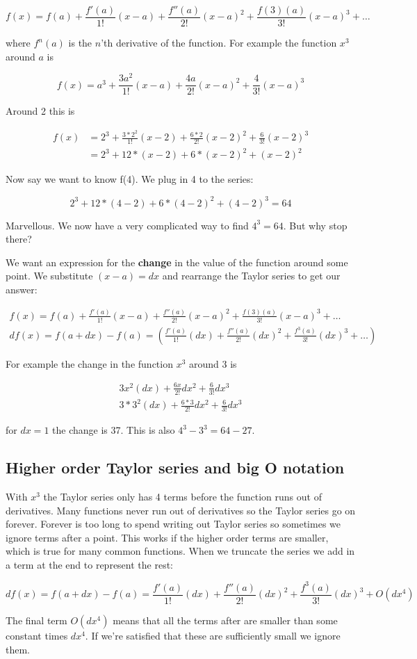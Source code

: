 \[f(x) = f(a) + \frac{f'(a)}{1!}(x-a) + \frac{f''(a)}{2!}(x-a)^2 + \frac{f(3)(a)}{3!}(x-a)^3 + \ldots  \]

where $f^n(a)$ is the $n$'th derivative of the function. For example the function $x^3$ around $a$ is  

\[f(x) = a^3 + \frac{3a^2}{1!}(x-a)  + \frac{4a}{2!}(x-a)^2 + \frac{4}{3!}(x-a)^3\]

Around 2 this is

\begin{eqnarray*}
f(x) &= 2^3 + \frac{3*2^2}{1!}(x-2)  + \frac{6*2}{2!}(x-2)^2 + \frac{6}{3!}(x-2)^3 \\
 &= 2^3 + 12*(x-2) + 6*(x-2)^2 + (x-2)^2
\end{eqnarray*}

Now say we want to know f(4). We plug in 4 to the series:

\[2^3 +12*(4-2) + 6*(4-2)^2 + (4-2)^3 = 64\]
 
 Marvellous. We now have a very complicated way to find $4^3=64$. But why stop there? 
 
 We want an expression for the \textbf{change} in the value of the function around some point. We substitute $(x-a) = dx$ and rearrange the Taylor series to get our answer:
 
 
 \begin{eqnarray*}
 f(x) = f(a) + \frac{f'(a)}{1!}(x-a) + \frac{f''(a)}{2!}(x-a)^2 + \frac{f(3)(a)}{3!}(x-a)^3 + \ldots  \\
df(x) =f(a+dx) -  f(a)  =  \left(\frac{f'(a)}{1!}(dx) + \frac{f''(a)}{2!}(dx)^2 + \frac{f^3(a)}{3!}(dx)^3 + \ldots \right) 
\end{eqnarray*}

For example the change in the function $x^3$ around 3 is

\begin{eqnarray*}
3x^2(dx) + \frac{6x}{2!}dx^2 + \frac{6}{3!}dx^3\\
3*3^2(dx) + \frac{6*3}{2!}dx^2 + \frac{6}{3!}dx^3
\end{eqnarray*}


for $dx=1$ the change is 37. This is also $4^3-3^3 = 64-27$.

\subsection*{Higher order Taylor series and big O notation}
With $x^3$ the Taylor series only has 4 terms before the function runs out of derivatives. Many functions never run out of derivatives so the Taylor series go on forever. Forever is too long to spend writing out Taylor series so sometimes we ignore terms after a point. This works if the higher order terms are smaller, which is true for many common functions. When we truncate the series we add in a term at the end to represent the rest:

\[df(x) =f(a+dx) -  f(a)  =\frac{f'(a)}{1!}(dx) + \frac{f''(a)}{2!}(dx)^2 + \frac{f^3(a)}{3!}(dx)^3 + O(dx^4)\]

The final term $O(dx^4)$ means that all the terms after are smaller than some constant times $dx^4$.  If we're satisfied that these are sufficiently small we ignore them.



